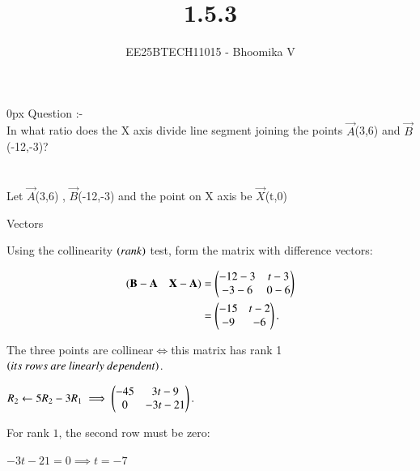 \documentclass[journal]{IEEEtran}
\begin{document}

\vspace{3cm}

\title{1.5.3}
\author{EE25BTECH11015 - Bhoomika V}
{\let\newpage\relax\maketitle}

\renewcommand{\thefigure}{\theenumi}
\renewcommand{\thetable}{\theenumi}
\setlength{\intextsep}{10pt} %


\renewcommand{\thetable}{\theenumi}
\parindent 0px 
{Question :-} \\ 
In what ratio does the X axis divide line segment joining the points $\vec{A}$(3,6) and $\vec{B}$(-12,-3)? \\ \\
\solution \\
Let $\vec{A}$(3,6) , $\vec{B}$(-12,-3) and the point on X axis be $\vec{X}$(t,0)\\

\begin{table}[H]    
  \centering
  
  \caption{Vectors}
  \label{Answers}
\end{table}

Using the collinearity $\left(rank\right)$ test, form the matrix with difference vectors:

\begin{align*}
(\mathbf{B}-\mathbf{A} \quad \mathbf{X}-\mathbf{A}) &= \begin{pmatrix}-12-3 & t-3 \\ -3-6 & 0-6\end{pmatrix} \\
    &= \begin{pmatrix}-15 & t-2 \\ -9 & -6\end{pmatrix}.
\end{align*}

The three points are collinear$\iff$this matrix has rank 1 $\brak{its\ rows\ are\ linearly\ dependent}$.\\
\begin{center}
 $R_2 \leftarrow 5R_2 - 3R_1 \implies  \begin{pmatrix}-45 & 3t-9 \\ 0 & -3t-21 \end{pmatrix}.$
 \end{center}

 For rank $1$, the second row must be zero:
\begin{center}
$-3t-21= 0 \implies t =-7$
\end{center}
\end{document}

